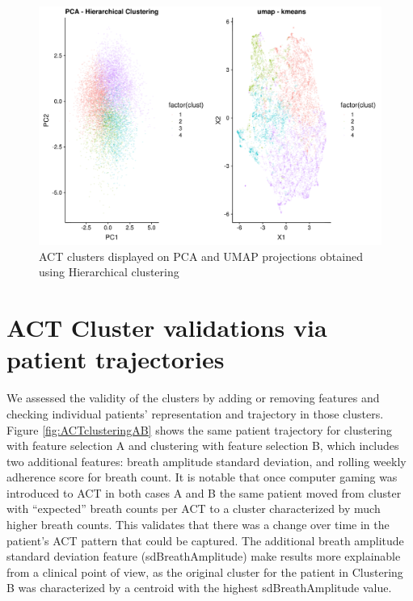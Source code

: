 \documentclass{article}
\begin{document}
\begin{figure}[H]
  \centering
  \includegraphics[scale=0.5]{fig_ACT_HC_4_Clusters.png}
  \caption{ACT clusters displayed on PCA and UMAP projections obtained using Hierarchical clustering}
  \label{fig:figHC4clusters}
\end{figure}

\section{ACT Cluster validations via patient trajectories}
\label{appendix:actpatienttrajectories}

We assessed the validity of the clusters by adding or removing features and checking individual patients’ representation and trajectory in those clusters. Figure \ref{fig:ACTclusteringAB} shows the same patient trajectory for clustering with feature selection A and clustering with feature selection B, which includes two additional features: breath amplitude standard deviation, and rolling weekly adherence score for breath count. It is notable that once computer gaming was introduced to ACT in both cases A and B the same patient moved from cluster with “expected” breath counts per ACT to a cluster characterized by much higher breath counts. This validates that there was a change over time in the patient’s ACT pattern that could be captured. The additional breath amplitude standard deviation feature (sdBreathAmplitude) make results more explainable from a clinical point of view, as the original cluster for the patient in Clustering B was characterized by a centroid with the highest sdBreathAmplitude value. 
\end{document}

